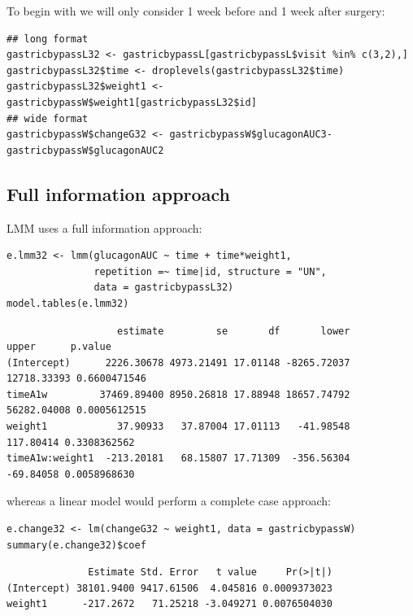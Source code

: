 \documentclass[12pt]{article}
\begin{document}
To begin with we will only consider 1 week before and 1 week after
surgery:
\lstset{language=r,label= ,caption= ,captionpos=b,numbers=none}
\begin{lstlisting}
## long format
gastricbypassL32 <- gastricbypassL[gastricbypassL$visit %in% c(3,2),]
gastricbypassL32$time <- droplevels(gastricbypassL32$time)
gastricbypassL32$weight1 <- gastricbypassW$weight1[gastricbypassL32$id]
## wide format
gastricbypassW$changeG32 <- gastricbypassW$glucagonAUC3-gastricbypassW$glucagonAUC2
\end{lstlisting}

\clearpage

\subsection{Full information approach}
\label{sec:org4461a17}

LMM uses a full information approach:
\lstset{language=r,label= ,caption= ,captionpos=b,numbers=none}
\begin{lstlisting}
e.lmm32 <- lmm(glucagonAUC ~ time + time*weight1,
               repetition =~ time|id, structure = "UN",
               data = gastricbypassL32)
model.tables(e.lmm32)
\end{lstlisting}

\begin{verbatim}
                   estimate         se       df       lower       upper      p.value
(Intercept)      2226.30678 4973.21491 17.01148 -8265.72037 12718.33393 0.6600471546
timeA1w         37469.89400 8950.26818 17.88948 18657.74792 56282.04008 0.0005612515
weight1            37.90933   37.87004 17.01113   -41.98548   117.80414 0.3308362562
timeA1w:weight1  -213.20181   68.15807 17.71309  -356.56304   -69.84058 0.0058968630
\end{verbatim}


whereas a linear model would perform a complete case approach:
\lstset{language=r,label= ,caption= ,captionpos=b,numbers=none}
\begin{lstlisting}
e.change32 <- lm(changeG32 ~ weight1, data = gastricbypassW)
summary(e.change32)$coef
\end{lstlisting}

\begin{verbatim}
              Estimate Std. Error   t value     Pr(>|t|)
(Intercept) 38101.9400 9417.61506  4.045816 0.0009373023
weight1      -217.2672   71.25218 -3.049271 0.0076504030
\end{verbatim}
\end{document}
